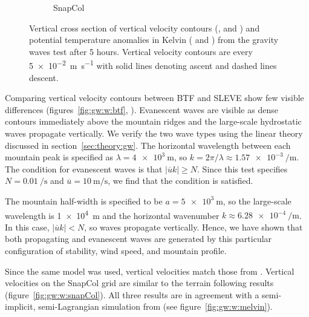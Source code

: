 \begin{figure}
\begin{subfigure}[b]{0.48\textwidth}
		\caption{SnapCol}
		\label{fig:gw:thetaDiff:snapCol}
	\end{subfigure}
%
	\caption{Vertical cross section of vertical velocity contours (,  and ) and potential temperature anomalies in Kelvin ( and ) from the gravity waves test after 5 hours.  Vertical velocity contours are every \SI{5e-2}{\meter\per\second} with solid lines denoting ascent and dashed lines descent.}
	\label{fig:gw:w}
\end{figure}

Comparing vertical velocity contours between BTF and SLEVE show few visible differences (figures~\ref{fig:gw:w:btf}, ).  Evanescent waves are visible as dense contours immediately above the mountain ridges and the large-scale hydrostatic waves propagate vertically.  We verify the two wave types using the linear theory discussed in section~\ref{sec:theory:gw}.  The horizontal wavelength between each mountain peak is specified as $\lambda = \SI{4e3}{\meter}$, so $k = 2 \pi / \lambda \approx \SI{1.57e-3}{\per\meter}$.  The condition for evanescent waves is that $| \overline{u}k | \geq N$.  Since this test specifies $N = \SI{0.01}{\per\second}$ and $\overline{u} = \SI{10}{\meter\per\second}$, we find that the condition is satisfied.

The mountain half-width is specified to be $a = \SI{5e3}{\meter}$, so the large-scale wavelength is \SI{1e4}{\meter} and the horizontal wavenumber $k \approx \SI{6.28e-4}{\per\meter}$.  In this case, $| \overline{u}k | < N$, so waves propagate vertically.  Hence, we have shown that both propagating and evanescent waves are generated by this particular configuration of stability, wind speed, and mountain profile.

Since the same model was used, vertical velocities match those from \textcite{weller-shahrokhi2014}.  Vertical velocities on the SnapCol grid are similar to the terrain following results (figure~\ref{fig:gw:w:snapCol}).  All three results are in agreement with a semi-implicit, semi-Lagrangian simulation from \textcite{melvin2010} (see figure~\ref{fig:gw:w:melvin}).


